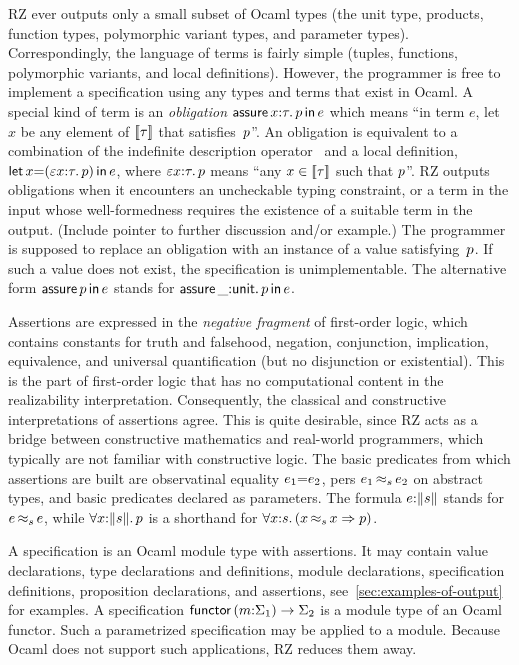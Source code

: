 RZ ever outputs only a small subset of Ocaml types (the unit type,
products, function types, polymorphic variant types, and parameter
types). Correspondingly, the language of terms is fairly simple
(tuples, functions, polymorphic variants, and local definitions).
However, the programmer is free to implement a specification using any
types and terms that exist in Ocaml. A special kind of term is an
\emph{obligation} $\ooblig{\ox}{\oty}{\op}{\oe}$ which means ``in term
$e$, let $x$ be any element of $\values{\oty}$ that satisfies~$\op$''.
An obligation is equivalent to a combination of the indefinite
description operator~\cite{epsilon-reference} and a local definition,
$\olet{\ox}{(\varepsilon \ox {:} \oty.\,\op)}{\oe}$, where
$\varepsilon \ox {:} \oty.\, \op$ means ``any $x \in \values{\oty}$
such that $\op$''. RZ outputs obligations when it encounters an
uncheckable typing constraint, or a term in the input whose
well-formedness requires the existence of a suitable term in the
output. (Include pointer to further discussion and/or example.) The
programmer is supposed to replace an obligation with an instance of a
value satisfying~$\op$. If such a value does not exist, the
specification is unimplementable. The alternative form
$\oobligx{\op}{\oe}$ stands for $\ooblig{\_}{\ounit}{\op}{\oe}$.

Assertions are expressed in the \emph{negative fragment} of
first-order logic, which contains constants for truth and falsehood,
negation, conjunction, implication, equivalence, and universal
quantification (but no disjunction or existential). This is the part
of first-order logic that has no computational content in the
realizability interpretation. Consequently, the classical and
constructive interpretations of assertions agree. This is quite
desirable, since RZ acts as a bridge between constructive mathematics
and real-world programmers, which typically are not familiar with
constructive logic. The basic predicates from which assertions are
built are observatinal equality $\oequal{\oe_1}{\oe_2}$, pers
$\oper{s}{\oe_1}{\oe_2}$ on abstract types, and basic predicates
declared as parameters. The formula $\ototal{\oe}{\os}$ stands for
$\oper{\os}{\oe}{\oe}$, while $\oforallt{\ox}{\os}{\op}$ is a
shorthand for
$\oforall{\ox}{\os}{(\oimply{\oper{\os}{\ox}{\ox}}{p})}$.

A specification is an Ocaml module type with assertions. It may
contain value declarations, type declarations and definitions, module
declarations, specification definitions, proposition declarations, and
assertions, see~\ref{sec:examples-of-output} for examples. A
specification $\ofunctor{\om}{\omt_1}{\omt_2}$ is a module type of an
Ocaml functor. Such a parametrized specification may be applied to a
module. Because Ocaml does not support such applications, RZ reduces
them away.


